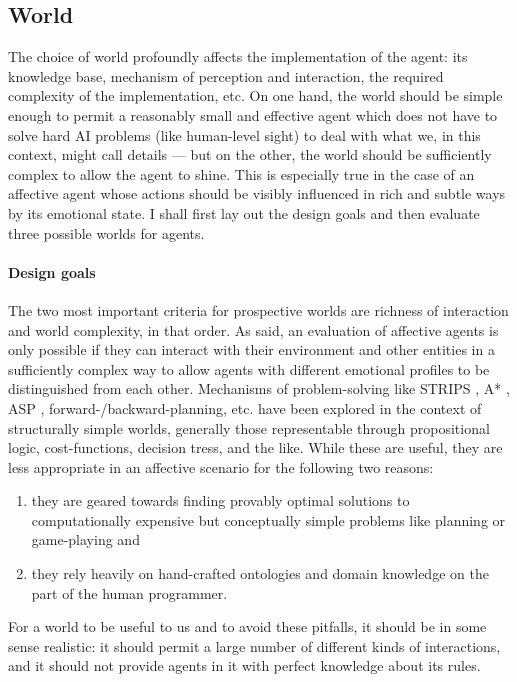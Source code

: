 \subsection{World}

The choice of world profoundly affects the implementation of the agent: its knowledge base, mechanism of perception and interaction, the required complexity of the implementation, etc. On one hand, the world should be simple enough to permit a reasonably small and effective agent which does not have to solve hard AI problems (like human-level sight) to deal with what we, in this context, might call details --- but on the other, the world should be sufficiently complex to allow the agent to shine. This is especially true in the case of an affective agent whose actions should be visibly influenced in rich and subtle ways by its emotional state. I shall first lay out the design goals and then evaluate three possible worlds for agents.

\paragraph{Design goals} The two most important criteria for prospective worlds are richness of interaction and world complexity, in that order. As said, an evaluation of affective agents is only possible if they can interact with their environment and other entities in a sufficiently complex way to allow agents with different emotional profiles to be distinguished from each other. Mechanisms of problem-solving like STRIPS \cite{fikesNilsson}, A* \cite{nilssonAStar}, ASP \cite{lifschitz}, forward-/backward-planning, etc. have been explored in the context of structurally simple worlds, generally those representable through propositional logic, cost-functions, decision tress, and the like. While these are useful, they are less appropriate in an affective scenario for the following two reasons:

\begin{enumerate}
	\item they are geared towards finding provably optimal solutions to computationally expensive but conceptually simple problems like planning or game-playing and
	\item they rely heavily on hand-crafted ontologies and domain knowledge on the part of the human programmer.
\end{enumerate}

For a world to be useful to us and to avoid these pitfalls, it should be in some sense realistic: it should permit a large number of different kinds of interactions, and it should not provide agents in it with perfect knowledge about its rules. 

